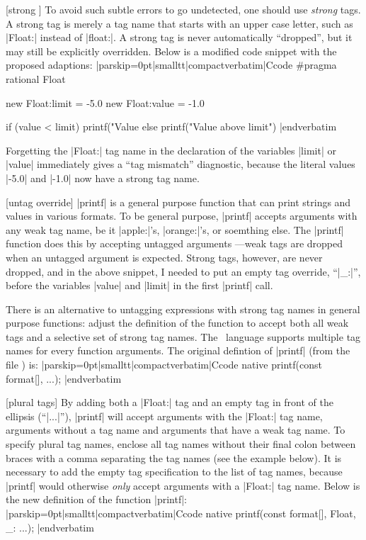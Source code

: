 [strong \midtilde]
To avoid such subtle errors to go undetected, one should use {\it strong\/}
tags. A strong tag is merely a tag name that starts with an upper case letter,
such as |Float:| instead of |float:|. A strong tag is never automatically
``dropped'', but it may still be explicitly overridden. Below is a modified
code snippet with the proposed adaptions:
\listingx\verbatim|parskip=0pt|smalltt|compactverbatim|Ccode
#pragma rational Float

new Float:limit = -5.0
new Float:value = -1.0

if (value < limit)
    printf("Value %
else
    printf("Value above limit\n")
|endverbatim\endlistingx

Forgetting the |Float:| tag name in the declaration of the variables |limit|
or |value| immediately gives a ``tag mismatch'' diagnostic, because the literal
values |-5.0| and |-1.0| now have a strong tag name.

[untag override] 
|printf| is a general purpose function that can print strings and values in
various formats. To be general purpose, |printf| accepts arguments with any
weak tag name, be it |apple:|'s, |orange:|'s, or soemthing else. The |printf|
function does this by accepting untagged arguments ---weak tags are dropped
when an untagged argument is expected. Strong tags, however, are never dropped,
and in the above snippet, I needed to put an empty tag override, ``|_:|'',
before the variables |value| and |limit| in the first |printf| call.

There is an alternative to untagging expressions with strong tag names in
general purpose functions: adjust the definition of the function to accept
both all weak tags and a selective set of strong tag names. The \Small\ language
supports multiple tag names for every function arguments. The original defintion
of |printf| (from the file ) is:
\listingx\verbatim|parskip=0pt|smalltt|compactverbatim|Ccode
native printf(const format[], ...);
|endverbatim\endlistingx

 [plural tags]
By adding both a |Float:| tag and an empty tag in front of the ellipsis (``|...|''),
|printf| will accept arguments with the |Float:| tag name, arguments without a
tag name and arguments that have a weak tag name. To specify plural tag names,
enclose all tag names without their final colon between braces with a comma
separating the tag names (see the example below). It is necessary to add the
empty tag specification to the list of tag names, because |printf| would
otherwise {\it only\/} accept arguments with a |Float:| tag name. Below is the
new definition of the function |printf|:
\listingx\verbatim|parskip=0pt|smalltt|compactverbatim|Ccode
native printf(const format[], {Float, _}: ...);
|endverbatim\endlistingx

